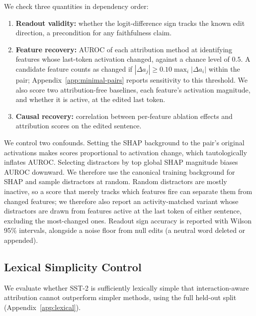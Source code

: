 We check three quantities in dependency order:
\begin{enumerate}
\item \textbf{Readout validity:} whether the logit-difference sign tracks the known edit direction, a precondition for any faithfulness claim.
\item \textbf{Feature recovery:} AUROC of each attribution method at identifying features whose last-token activation changed, against a chance level of $0.5$. A candidate feature counts as changed if $|\Delta a_j| \ge 0.10\max_i|\Delta a_i|$ within the pair; Appendix~\ref{app:minimal-pairs} reports sensitivity to this threshold. We also score two attribution-free baselines, each feature's activation magnitude, and whether it is active, at the edited last token.
\item \textbf{Causal recovery:} correlation between per-feature ablation effects and attribution scores on the edited sentence.
\end{enumerate}

We control two confounds. Setting the SHAP background to the pair’s original activations makes scores proportional to activation change, which tautologically inflates AUROC. Selecting distractors by top global SHAP magnitude biases AUROC downward. We therefore use the canonical training background for SHAP and sample distractors at random. Random distractors are mostly inactive, so a score that merely tracks which features fire can separate them from changed features; we therefore also report an activity-matched variant whose distractors are drawn from features active at the last token of either sentence, excluding the most-changed ones. Readout sign accuracy is reported with Wilson 95\% intervals, alongside a noise floor from null edits (a neutral word deleted or appended).

\subsection{Lexical Simplicity Control}
We evaluate whether SST-2 is sufficiently lexically simple that interaction-aware attribution cannot outperform simpler methods, using the full held-out split (Appendix~\ref{app:lexical}). 

